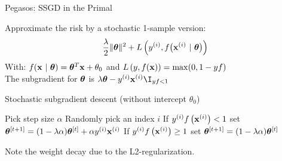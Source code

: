 \documentclass[11pt,compress,t,notes=noshow, xcolor=table]{beamer}
\begin{document}






\begin{vbframe}{Pegasos: SSGD in the Primal}

Approximate the risk by a stochastic 1-sample version: 
\vspace{-0.3cm}
$$ \frac{\lambda}{2} \|\bm{\theta}\|^2 + L\left(y^{(i)}, f\big(\mathbf{x}^{(i)} ~|~ \bm{\theta}\big)\right) $$
With: $f(\mathbf{x} ~|~ \bm{\theta}) = \bm{\theta}^T \mathbf{x} + \theta_0$ and $L\left(y, f(\mathbf{x})\right) = \max(0, 1 -  y f)$\\
The subgradient for $\bm{\theta}$ is $\lambda \thetav - \yi \xi \I_{yf < 1}$

\vspace{-0.1cm}

\begin{algorithm}[H]
  \caption*{Stochastic subgradient descent (without intercept $\theta_0$)}
  \begin{algorithmic}[1]
      \State Pick step size $\alpha$
      \State Randomly pick an index $i$
      \State If $y^{(i)} f\left(\mathbf{x}^{(i)}\right) < 1$ set $\bm{\theta}^{[t +1]} = (1 - \lambda \alpha) \bm{\theta}^{[t]} + \alpha y^{(i)} \mathbf{x}^{(i)}$ 
      \State If $y^{(i)} f\left(\mathbf{x}^{(i)}\right) \geq 1$ set $\bm{\theta}^{[t +1]} = (1 - \lambda \alpha) \bm{\theta}^{[t]}$ 
      \EndFor
  \end{algorithmic}
\end{algorithm}
\vspace{-0.2cm}
Note the weight decay due to the L2-regularization.
\end{vbframe}
\end{document}
